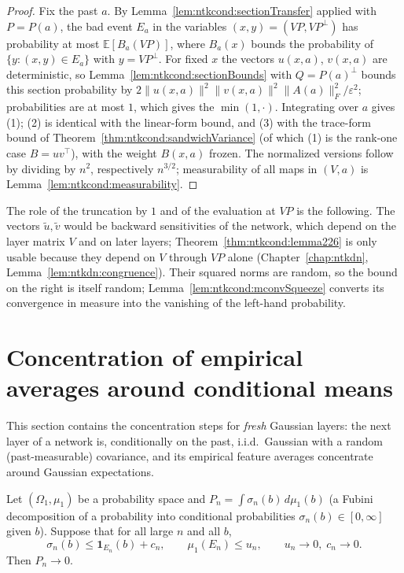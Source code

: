 \begin{proof}
  \leanok
Fix the past $a$. By Lemma~\ref{lem:ntkcond:sectionTransfer} applied with $P=P(a)$, the bad event $E_a$ in the variables $(x,y)=(VP,VP^\perp)$ has probability at most $\mathbb E[B_a(VP)]$, where $B_a(x)$ bounds the probability of $\{y:(x,y)\in E_a\}$ with $y=VP^\perp$. For fixed $x$ the vectors $u(x,a)$, $v(x,a)$ are deterministic, so Lemma~\ref{lem:ntkcond:sectionBounds} with $Q=P(a)^\perp$ bounds this section probability by $2\|u(x,a)\|^2\|v(x,a)\|^2\|A(a)\|_F^2/\varepsilon^2$; probabilities are at most $1$, which gives the $\min(1,\cdot)$. Integrating over $a$ gives (1); (2) is identical with the linear-form bound, and (3) with the trace-form bound of Theorem~\ref{thm:ntkcond:sandwichVariance} (of which (1) is the rank-one case $B=uv^\top$), with the weight $B(x,a)$ frozen. The normalized versions follow by dividing by $n^2$, respectively $n^{3/2}$; measurability of all maps in $(V,a)$ is Lemma~\ref{lem:ntkcond:measurability}.
\end{proof}

The role of the truncation by $1$ and of the evaluation at $VP$ is the following. The vectors $\tilde u,\tilde v$ would be backward sensitivities of the network, which depend on the layer matrix $V$ and on later layers; Theorem~\ref{thm:ntkcond:lemma226} is only usable because they depend on $V$ through $VP$ alone (Chapter~\ref{chap:ntkdn}, Lemma~\ref{lem:ntkdn:congruence}). Their squared norms are random, so the bound on the right is itself random; Lemma~\ref{lem:ntkcond:mconvSqueeze} converts its convergence in measure into the vanishing of the left-hand probability.


\section{Concentration of empirical averages around conditional means}\label{sec:ntkcond:concentration}

This section contains the concentration steps for \emph{fresh} Gaussian layers: the next layer of a network is, conditionally on the past, i.i.d.\ Gaussian with a random (past-measurable) covariance, and its empirical feature averages concentrate around Gaussian expectations.

\begin{lemma}\label{lem:ntkcond:sectionSqueeze}
  \leanok
Let $(\Omega_1,\mu_1)$ be a probability space and $P_n=\int\sigma_n(b)\,d\mu_1(b)$ (a Fubini decomposition of a probability into conditional probabilities $\sigma_n(b)\in[0,\infty]$ given $b$). Suppose that for all large $n$ and all $b$,
\[
  \sigma_n(b)\le\mathbf 1_{E_n}(b)+c_n,\qquad\mu_1(E_n)\le u_n,\qquad u_n\to0,\;c_n\to0 .
\]
Then $P_n\to0$.
\end{lemma}

